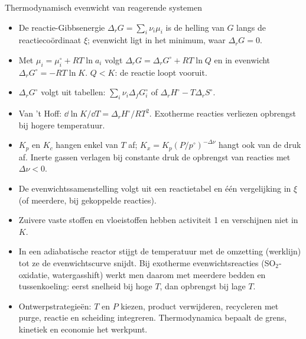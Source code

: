 \begin{samenvatting}{Thermodynamisch evenwicht van reagerende systemen}
\begin{itemize}
\item De reactie-Gibbsenergie $\Delta_rG=\sum_i\nu_i\mu_i$ is de helling van $G$ langs de reactieco\"ordinaat $\xi$; evenwicht ligt in het minimum, waar $\Delta_rG=0$.
\item Met $\mu_i=\mu_i^\circ+RT\ln a_i$ volgt $\Delta_rG=\Delta_rG^\circ+RT\ln Q$ en in evenwicht $\Delta_rG^\circ=-RT\ln K$. $Q<K$: de reactie loopt vooruit.
\item $\Delta_rG^\circ$ volgt uit tabellen: $\sum_i\nu_i\Delta_fG_i^\circ$ of $\Delta_rH^\circ-T\Delta_rS^\circ$.
\item Van 't Hoff: $\dd\ln K/\dd T=\Delta_rH^\circ/RT^2$. Exotherme reacties verliezen opbrengst bij hogere temperatuur.
\item $K_p$ en $K_c$ hangen enkel van $T$ af; $K_x=K_p(P/p^\circ)^{-\Delta\nu}$ hangt ook van de druk af. Inerte gassen verlagen bij constante druk de opbrengst van reacties met $\Delta\nu<0$.
\item De evenwichtssamenstelling volgt uit een reactietabel en \'e\'en vergelijking in $\xi$ (of meerdere, bij gekoppelde reacties).
\item Zuivere vaste stoffen en vloeistoffen hebben activiteit 1 en verschijnen niet in $K$.
\item In een adiabatische reactor stijgt de temperatuur met de omzetting (werklijn) tot ze de evenwichtscurve snijdt. Bij exotherme evenwichtsreacties (SO$_2$-oxidatie, watergasshift) werkt men daarom met meerdere bedden en tussenkoeling: eerst snelheid bij hoge $T$, dan opbrengst bij lage $T$.
\item Ontwerpstrategie\"en: $T$ en $P$ kiezen, product verwijderen, recycleren met purge, reactie en scheiding integreren. Thermodynamica bepaalt de grens, kinetiek en economie het werkpunt.
\end{itemize}
\end{samenvatting}

